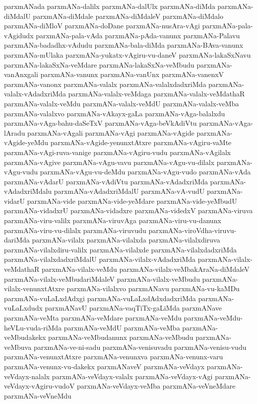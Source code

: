 {parxmANada
parxmANa-dalilx
parxmANa-dalUlx
parxmANa-diMda
parxmANa-diMdalU
parxmANa-diMdale
parxmANa-diMdaleV
parxmANa-diMdalo
parxmANa-diMloV
parxmANa-doDane
parxmANa-nusAra-vAgi
parxmANa-pala-vAgidudx
parxmANa-pala-vAda
parxmANa-pAda-vanunx
parxmANa-Palavu
parxmANa-badadhx-vAdudu
parxmANa-bala-diMda
parxmANa-BAva-vanunx
parxmANa-mUlaka
parxmANa-yukatx-vAgiru-vu-daneV
parxmANa-lakaSxNavu
parxmANa-lakaSxNa-veMdare
parxmANa-lakaSxNa-veMbudu
parxmANa-vanAnxgali
parxmANa-vanunx
parxmANa-vanUnx
parxmANa-vanenxV
parxmANa-vanonx
parxmANa-valalx
parxmANa-valalxdadxriMda
parxmANa-valalx-vAdadxriMda
parxmANa-valalx-veMdaga
parxmANa-valalx-veMdathaR
parxmANa-valalx-veMdu
parxmANa-valalx-veMdU
parxmANa-valalx-veMba
parxmANa-valalxvo
parxmANa-vAkayx-gaLa
parxmANa-vAga-balalxdu
parxmANa-vAga-bahu-daSeTxV
parxmANa-vAga-beVkAdiVtu
parxmANa-vAga-lAradu
parxmANa-vAgali
parxmANa-vAgi
parxmANa-vAgide
parxmANa-vAgide-yeMdu
parxmANa-vAgide-yenunxtAtxre
parxmANa-vAgiru-vaMte
parxmANa-vAgi-ruva-vanige
parxmANa-vAgiru-vudu
parxmANa-vAgilalx
parxmANa-vAgive
parxmANa-vAgu-vavu
parxmANa-vAgu-vu-dilalx
parxmANa-vAgu-vudu
parxmANa-vAgu-vu-deMdu
parxmANa-vAgu-vudo
parxmANa-vAda
parxmANa-vAdarU
parxmANa-vAdiVtu
parxmANa-vAdadxriMda
parxmANa-vAdadxriMdalu
parxmANa-vAdadxriMdalU
parxmANa-vA-vudU
parxmANa-vidarU
parxmANa-vide
parxmANa-vide-yeMdare
parxmANa-vide-yeMbudU
parxmANa-vidadxrU
parxmANa-vidadxre
parxmANa-videdxV
parxmANa-viruva
parxmANa-viru-valilx
parxmANa-viruvAga
parxmANa-viru-vu-danunx
parxmANa-viru-vu-dilalx
parxmANa-viruvudu
parxmANa-viroVdha-viruvu-dariMda
parxmANa-vilalx
parxmANa-vilalxda
parxmANa-vilalxdiruva
parxmANa-vilalxdiru-valilx
parxmANa-vilalxde
parxmANa-vilalxdadxriMda
parxmANa-vilalxdadxriMdalU
parxmANa-vilalx-vAdadxriMda
parxmANa-vilalx-veMdathaR
parxmANa-vilalx-veMdu
parxmANa-vilalx-veMbakAraNa-diMdaleV
parxmANa-vilalx-veMbudariMdaleV
parxmANa-vilalx-veMbudu
parxmANa-vilalx-venunxtAtxre
parxmANa-vilalxvo
parxmANavu
parxmANa-vu-kaMDu
parxmANa-vuLaLxdAdxgi
parxmANa-vuLaLxdAdxdadxriMda
parxmANa-vuLaLxdudx
parxmANavU
parxmANa-vaqTiTx-gaLiMda
parxmANave
parxmANa-veMta
parxmANa-veMdare
parxmANa-veMdu
parxmANa-veMdu-heVLu-vuda-riMda
parxmANa-veMdU
parxmANa-veMba
parxmANa-veMbudakekx
parxmANa-veMbudanunx
parxmANa-veMbudu
parxmANa-veMbuva
parxmANa-ve-ni-sadu
parxmANa-venisuvadu
parxmANa-venisu-vudu
parxmANa-venunxtAtxre
parxmANa-venunxva
parxmANa-venunx-varu
parxmANa-venunx-vu-dakekx
parxmANaveV
parxmANa-veVdayx
parxmANa-veVdayx-nalalx
parxmANa-veVdayx-valalx
parxmANa-veVdayx-vAgi
parxmANa-veVdayx-vAgiru-vudoV
parxmANa-veVdayx-veMba
parxmANa-veVneMdare
parxmANa-veVneMdu
}
